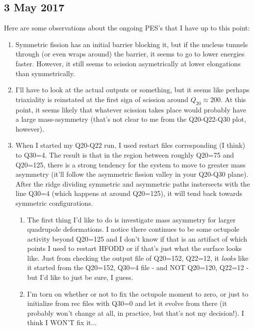 \subsection*{3 May 2017}
Here are some observations about the ongoing PES's that I have up to this point:
\begin{enumerate}
\item Symmetric fission has an initial barrier blocking it, but if the nucleus tunnels through (or even wraps around) the barrier, it seems to go to lower energies faster. However, it still seems to scission asymetrically at lower elongations than symmetrically.
\item I'll have to look at the actual outputs or something, but it seems like perhaps triaxiality is reinstated at the first sign of scission around $Q_{20}\approx200$. At this point, it seems likely that whatever scission takes place would probably have a large mass-asymmetry (that's not clear to me from the Q20-Q22-Q30 plot, however).
\item When I started my Q20-Q22 run, I used restart files corresponding (I think) to Q30=4. The result is that in the region between roughly Q20=75 and Q20=125, there is a strong tendency for the system to move to greater mass asymmetry (it'll follow the asymmetric fission valley in your Q20-Q30 plane). After the ridge dividing symmetric and asymmetric paths instersects with the line Q30=4 (which happens at around Q20=125), it will tend back towards symmetric configurations.
\begin{enumerate}
\item The first thing I'd like to do is investigate mass asymmetry for larger quadrupole deformations. I notice there continues to be some octupole activity beyond Q20=125 and I don't know if that is an artifact of which points I used to restart HFODD or if that's just what the surface looks like. Just from checking the output file of Q20=152, Q22=12, it \textit{looks} like it started from the Q20=152, Q30=4 file - and NOT Q20=120, Q22=12 - but I'd like to just be sure, I guess.
\item I'm torn on whether or not to fix the octupole moment to zero, or just to initialize from rec files with Q30=0 and let it evolve from there (it probably won't change at all, in practice, but that's not my decision!). I think I WON'T fix it...
\end{enumerate} 
\end{enumerate}

